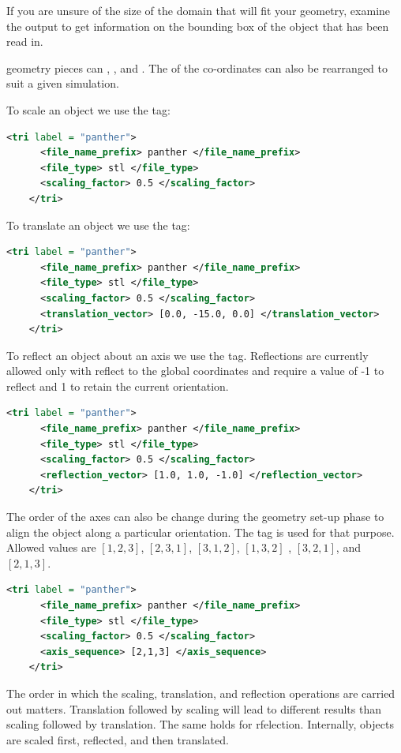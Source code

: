 \begin{minipage}{0.6\textwidth}
  \begin{NoteBox}
  If you are unsure of the size of the domain that will fit your geometry,
  examine the output to get information on the bounding box of the object that
  has been read in.
  \end{NoteBox}
   geometry pieces can , , and 
  .  The  of the co-ordinates can also be
  rearranged to suit a given simulation.

  To scale an object we use the  tag:
  \begin{lstlisting}[language=XML]
    <tri label = "panther">
      <file_name_prefix> panther </file_name_prefix>
      <file_type> stl </file_type>
      <scaling_factor> 0.5 </scaling_factor>
    </tri>
  \end{lstlisting}

  To translate an object we use the  tag:
  \begin{lstlisting}[language=XML]
    <tri label = "panther">
      <file_name_prefix> panther </file_name_prefix>
      <file_type> stl </file_type>
      <scaling_factor> 0.5 </scaling_factor>
      <translation_vector> [0.0, -15.0, 0.0] </translation_vector>
    </tri>
  \end{lstlisting}

  To reflect an object about an axis we use the  tag.
  Reflections are currently allowed only with reflect to the global coordinates
  and require a value of -1 to reflect and 1 to retain the current orientation.
  \begin{lstlisting}[language=XML]
    <tri label = "panther">
      <file_name_prefix> panther </file_name_prefix>
      <file_type> stl </file_type>
      <scaling_factor> 0.5 </scaling_factor>
      <reflection_vector> [1.0, 1.0, -1.0] </reflection_vector>
    </tri>
  \end{lstlisting}

  The order of the axes can also be change during the geometry set-up phase
  to align the object along a particular orientation.  The 
  tag is used for that purpose.  Allowed values are $[1,2,3]$, $[2,3,1]$, $[3,1,2]$,
  $[1,3,2]$ , $[3,2,1]$, and $[2,1,3]$.
  \begin{lstlisting}[language=XML]
    <tri label = "panther">
      <file_name_prefix> panther </file_name_prefix>
      <file_type> stl </file_type>
      <scaling_factor> 0.5 </scaling_factor>
      <axis_sequence> [2,1,3] </axis_sequence>
    </tri>
  \end{lstlisting}

  \begin{WarningBox}
  The order in which the scaling, translation, and reflection operations are carried
  out matters.  Translation followed by scaling will lead to different results than 
  scaling followed by translation.  The same holds for rfelection.  Internally, objects
  are scaled first, reflected, and then translated.
  \end{WarningBox}
\end{minipage}
